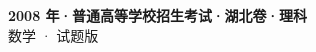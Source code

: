 \documentclass[zihao=-4, a4paper]{ctexart}
\begin{document}
\begin{center}
  {\Large\bfseries 2008 年·普通高等学校招生考试·湖北卷·理科}\\[4pt]
  {\large 数学 · 试题版}
\end{center}
\medskip
{}

\end{document}
